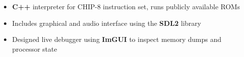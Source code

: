 \documentclass{moderncv}
\begin{document}
{\begin{itemize}
    \item \textbf{C++} interpreter for CHIP-8 instruction set, runs publicly available ROMs
    \item Includes graphical and audio interface using the \textbf{SDL2} library
    \item Designed live debugger using \textbf{ImGUI} to inspect memory dumps and processor state
\end{itemize}}

\begin{comment}
\cventry{Dec 2021 - Jan 2022}{3D Rasterized Render System}{}{C++ | CMake | OpenGL}{}
{\begin{itemize}
    \item 3D rasterized rendering system written with \textbf{OpenGL 3.3} in \textbf{C++17}
    \item Implemented mesh generation, texture loading and Phong lighting shaders
\end{itemize}}
\end{comment}

\begin{comment}
\cventry{Sep 2021 - Nov 2021}{Pipelined 32-Bit RISC-V Core}{}{Verilog | Verilator}{}
{\begin{itemize}
    \item Implemented RV32I spec in \textbf{Verilog} using a 5-stage pipeline design with register bypassing, simulated test programs (individual instructions and benchmark algorithms) using \textbf{Verilator} to verify design
\end{itemize}}
\end{comment}

\begin{comment}
\cventry{May 2021 - Sep 2021}{Real-Time Operating System Kernel}{}{C | ARM Assembly | Keil uVision}{}
{\begin{itemize}
    \item Implements custom memory manager, EDF scheduler, IPC, and interrupt-based I/O
    \item Targets \textbf{ARM Cortex-M3} processor, implemented context switching in assembly
    \item Allows user to run custom commands through \textbf{UART} terminal
\end{itemize}}
\end{comment}
\end{document}
